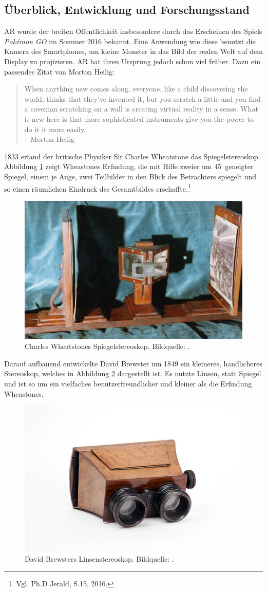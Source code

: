 \subsection{Überblick, Entwicklung und Forschungsstand}\label{ssec:arOverview}
AR wurde der breiten Öffentlichkeit insbesondere durch das Erscheinen des Spiels \textit{Pokémon GO} im Sommer 2016 bekannt. Eine Anwendung wie diese benutzt die Kamera des Smartphones, um kleine Monster in das Bild der realen Welt auf dem Display zu projizieren. AR hat ihren Ursprung jedoch schon viel früher. Dazu ein passendes Zitat von Morton Heilig:
\begin{quote}
	\frqq When anything new comes along, everyone, like a child discovering the world, thinks that they've invented it, but you scratch a little and you find a caveman scratching on a wall is creating virtual reality in a sense. What is new here is that more sophisticated instruments give you the power to do it it more easily.\flqq
	\\-- Morton Heilig
\end{quote}
1833 erfand der britische Physiker Sir Charles Wheatstone das Spiegelstereoskop. Abbildung \ref{fig:Wheatstone_Stereoscope} zeigt Wheastones Erfindung, die mit Hilfe zweier um 45\degree\ geneigter Spiegel, einem je Auge, zwei Teilbilder in den Blick des Betrachters spiegelt und so einen räumlichen Eindruck des Gesamtbildes erschaffte.\footnote{ Vgl. Ph.D Jerald, S.15, 2016.}
\begin{figure}[ht]
	\centering
	\includegraphics[width=.5\textwidth]{figuren/Wheatstone_Stereoscope}
	\caption{Charles Wheatstones Spiegelstereoskop. Bildquelle: \cite{wheatstone}.}
	\label{fig:Wheatstone_Stereoscope}
\end{figure}
Darauf aufbauend entwickelte David Brewster um 1849 ein kleineres, handlicheres Stereoskop, welches in Abbildung \ref{fig:Brewster_Stereoscope} dargestellt ist. Es nutzte Linsen, statt Spiegel und ist so um ein vielfaches benutzerfreundlicher und kleiner als die Erfindung Wheastones.
\begin{figure}[H]
	\centering
	\includegraphics[width=.5\textwidth]{figuren/Brewster_Stereoscope}
	\caption{David Brewsters Linsenstereoskop. Bildquelle: \cite{brewster}.}
	\label{fig:Brewster_Stereoscope}
\end{figure}
